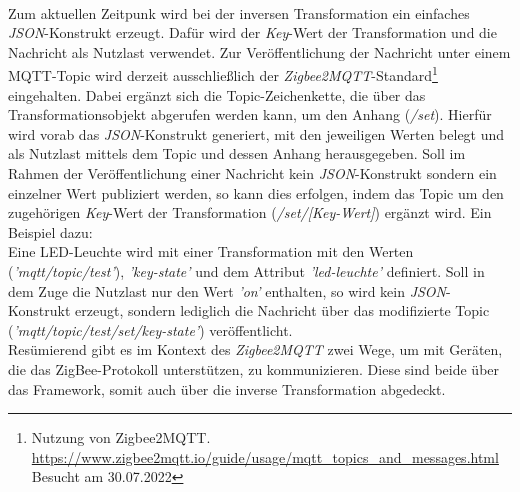     \\
    \linebreak
    Zum aktuellen Zeitpunk wird bei der inversen Transformation ein einfaches \textit{JSON}-Konstrukt erzeugt. Dafür wird der 
    \textit{Key}-Wert der Transformation und die Nachricht als Nutzlast verwendet. Zur Veröffentlichung der Nachricht unter einem 
    \acs{MQTT}-Topic wird derzeit ausschließlich der \textit{Zigbee2MQTT}-Standard\footnote{Nutzung von Zigbee2MQTT. \url{https://www.zigbee2mqtt.io/guide/usage/mqtt_topics_and_messages.html} Besucht am 30.07.2022} 
    eingehalten. Dabei ergänzt sich die Topic-Zeichenkette, die über das Transformationsobjekt abgerufen werden kann, um den Anhang (\textit{/set}). 
    Hierfür wird vorab das \textit{JSON}-Konstrukt generiert, mit den jeweiligen Werten belegt und als Nutzlast mittels dem 
    Topic und dessen Anhang herausgegeben. Soll im Rahmen der Veröffentlichung einer Nachricht kein \textit{JSON}-Konstrukt sondern ein einzelner Wert 
    publiziert werden, so kann dies erfolgen, indem das Topic um den zugehörigen \textit{Key}-Wert der Transformation (\textit{/set/[Key-Wert]}) ergänzt wird. Ein Beispiel dazu:
    \\
    Eine LED-Leuchte wird mit einer Transformation mit den Werten (\textit{'mqtt/topic/test'}), \textit{'key-state'} und dem Attribut \textit{'led-leuchte'} 
    definiert. Soll in dem Zuge die Nutzlast nur den Wert \textit{'on'} enthalten, so wird kein 
    \textit{JSON}-Konstrukt erzeugt, sondern lediglich die Nachricht über das modifizierte Topic (\textit{'mqtt/topic/test/set/key-state'}) veröffentlicht. 
    \\
    \linebreak
    Resümierend gibt es im Kontext des \textit{Zigbee2MQTT} zwei Wege, um mit Geräten, die das ZigBee-Protokoll unterstützen, zu kommunizieren. Diese sind beide 
    über das Framework, somit auch über die inverse Transformation abgedeckt.

%

